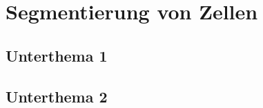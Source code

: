
\section{Segmentierung von Zellen}%
\label{sec:main}

\subsection{Unterthema 1}
\subsection{Unterthema 2}
